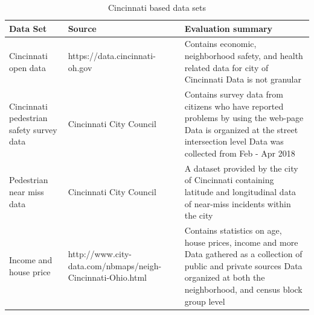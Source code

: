 \documentclass{llncs}
\begin{document}
\FloatBarrier
\begin{table}[!h]
\begin{center}
\caption{Cincinnati based data sets}
\label{table:cincinnatidatasets}
\begin{tabular}{ p{}  p{}  p{}}
\hline
\rule{0pt}{12pt}
Data Set
	& Source
	& Evaluation summary\\[2pt]
\hline
Cincinnati open data
	& https://data.cincinnati-oh.gov
	& Contains economic, neighborhood safety, and health related data for city of Cincinnati\newline
	Data is not granular\\
Cincinnati pedestrian safety survey data
	& Cincinnati City Council
	& Contains survey data from citizens who have reported problems by using the web-page\newline
	Data is organized at  the street intersection level\newline
	  Data was collected from Feb - Apr 2018\\
Pedestrian near miss data
	& Cincinnati City Council
	& A dataset provided by the city of Cincinnati containing latitude and longitudinal data of near-miss incidents within the city\\
Income and house price
	& http://www.city-data.com/nbmaps/neigh-Cincinnati-Ohio.html
	& Contains statistics on age, house prices, income and more\newline
	Data gathered as a collection of public and private sources\newline
	Data organized at both the neighborhood, and census block group level\\[2pt]
\hline
\end{tabular}
\end{center}
\end{table}
\FloatBarrier
%
\FloatBarrier
\end{document}

